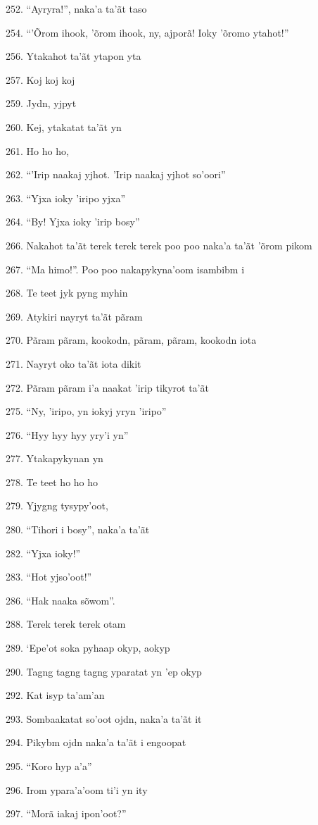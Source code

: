 252. ``Ayryra!'', naka'a ta'ãt taso

254. ``'Õrom ihook, 'õrom ihook, ny, ajporã! Ioky 'õromo ytahot!''

256. Ytakahot ta'ãt ytapon yta

257. Koj koj koj

259. Jydn, yjpyt

260. Kej, ytakatat ta'ãt yn

261. Ho ho ho,

262. ``'Irip naakaj yjhot. 'Irip naakaj yjhot so'oori''

263. ``Yjxa ioky 'iripo yjxa''

264. ``By! Yjxa ioky 'irip bosy''

266. Nakahot ta'ãt terek terek terek poo poo naka'a ta'ãt 'õrom pikom

267. ``Ma himo!''. Poo poo nakapykyna'oom isambibm i

268. Te teet jyk pyng myhin

269. Atykiri nayryt ta'ãt pãram

270. Pãram pãram, kookodn, pãram, pãram, kookodn iota

271. Nayryt oko ta'ãt iota dikit

272. Pãram pãram i'a naakat 'irip tikyrot ta'ãt

275. ``Ny, 'iripo, yn iokyj yryn 'iripo''

276. ``Hyy hyy hyy yry'i yn''

277. Ytakapykynan yn

278. Te teet ho ho ho

279. Yjygng tysypy'oot,

280. ``Tihori i bosy'', naka'a ta'ãt

282. ``Yjxa ioky!''

283. ``Hot yjso'oot!''

286. ``Hak naaka sõwom''.

288. Terek terek terek otam

289. `Epe'ot soka pyhaap okyp, aokyp

290. Tagng tagng tagng yparatat yn 'ep okyp

292. Kat isyp ta'am'an

293. Sombaakatat so'oot ojdn, naka'a ta'ãt it

294. Pikybm ojdn naka'a ta'ãt i engoopat

295. ``Koro hyp a'a''

296. Irom ypara'a'oom ti'i yn ity

297. ``Morã iakaj ipon'oot?''

